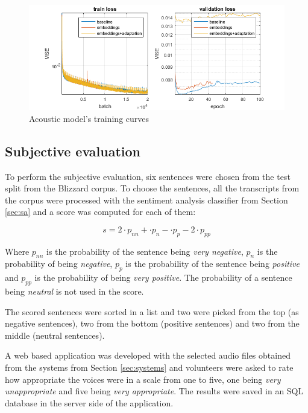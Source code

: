 \begin{figure}[h]
    \centering
    \includegraphics[width=14cm]{figures/aco}
    \caption{Acoustic model's training curves}
\end{figure}

\subsection{Subjective evaluation}

To perform the subjective evaluation, six sentences were chosen from the test split from the Blizzard corpus. To choose the sentences, all the transcripts from the corpus were processed with the sentiment analysis classifier from Section \ref{sec:sa} and a score was computed for each of them:

\begin{equation}
    s = 2 \cdot p_{nn} + \cdot p_{n} - \cdot p_{p} - 2 \cdot p_{pp}
\end{equation}

Where $p_{nn}$ is the probability of the sentence being \textit{very negative}, $p_n$ is the probability of being \textit{negative}, $p_p$ is the probability of the sentence being \textit{positive} and $p_{pp}$ is the probability of being \textit{very positive}. The probability of a sentence being \textit{neutral} is not used in the score.

The scored sentences were sorted in a list and two were picked from the top (as negative sentences), two from the bottom (positive sentences) and two from the middle (neutral sentences).

A web based application was developed with the selected audio files obtained from the systems from Section \ref{sec:systems} and volunteers were asked to rate how appropriate the voices were in a scale from one to five, one being \textit{very unappropriate} and five being \textit{very appropriate}. The results were saved in an SQL database in the server side of the application.

